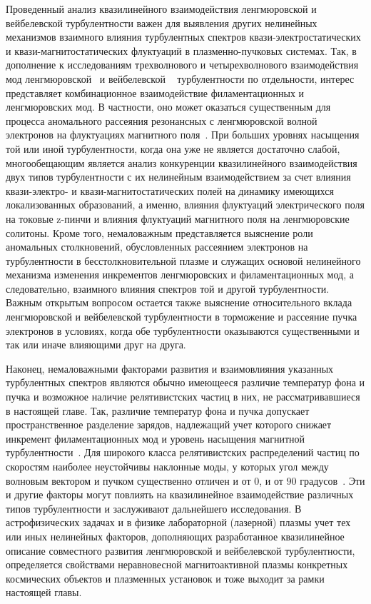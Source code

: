 Проведенный анализ квазилинейного взаимодействия ленгмюровской и вейбелевской турбулентности важен для выявления других нелинейных механизмов взаимного влияния турбулентных спектров квази-электростатических и квази-магнитостатических флуктуаций в плазменно-пучковых системах. Так, в дополнение к исследованиям трехволнового и четырехволнового взаимодействия мод ленгмюровской~\cite{Kasaba2001,Ziebell2008} и вейбелевской ~\cite{Garasev2021} турбулентности по отдельности, интерес представляет комбинационное взаимодействие филаментационных и ленгмюровских мод. В частности, оно может оказаться существенным для процесса аномального рассеяния резонансных с ленгмюровской волной электронов на флуктуациях магнитного поля~\cite{Fleishman2013,Medvedev2017,Krasnoselskikh2025}. При больших уровнях насыщения той или иной турбулентности, когда она уже не является достаточно слабой, многообещающим является анализ конкуренции квазилинейного взаимодействия двух типов турбулентности с их нелинейным взаимодействием за счет влияния квази-электро- и квази-магнитостатических полей на динамику имеющихся локализованных образований, а именно, влияния флуктуаций электрического поля на токовые z-пинчи и влияния флуктуаций магнитного поля на ленгмюровские солитоны. Кроме того, немаловажным представляется выяснение роли аномальных столкновений, обусловленных рассеянием электронов на турбулентности в бесстолкновительной плазме и служащих основой нелинейного механизма изменения инкрементов ленгмюровских и филаментационных мод, а следовательно, взаимного влияния спектров той и другой турбулентности. Важным открытым вопросом остается также выяснение относительного вклада ленгмюровской и вейбелевской турбулентности в торможение и рассеяние пучка электронов в условиях, когда обе турбулентности оказываются существенными и так или иначе влияющими друг на друга.

Наконец, немаловажными факторами развития и взаимовлияния указанных турбулентных спектров являются обычно имеющееся различие температур фона и пучка и возможное наличие релятивистских частиц в них, не рассматривавшиеся в настоящей главе. Так, различие температур фона и пучка допускает пространственное разделение зарядов, надлежащий учет которого снижает инкремент филаментационных мод и уровень насыщения магнитной турбулентности~\cite{Tzoufras2006,Hao2008,Jia2013}. Для широкого класса релятивистских распределений частиц по скоростям наиболее неустойчивы наклонные моды, у которых угол между волновым вектором и пучком существенно отличен и от $0$, и от $90$ градусов~\cite{Bret2004,Bret2010}. Эти и другие факторы могут повлиять на квазилинейное взаимодействие различных типов турбулентности и заслуживают дальнейшего исследования. В астрофизических задачах и в физике лабораторной (лазерной) плазмы учет тех или иных нелинейных факторов, дополняющих разработанное квазилинейное описание совместного развития ленгмюровской и вейбелевской турбулентности, определяется свойствами неравновесной магнитоактивной плазмы конкретных космических объектов и плазменных установок и тоже выходит за рамки настоящей главы.